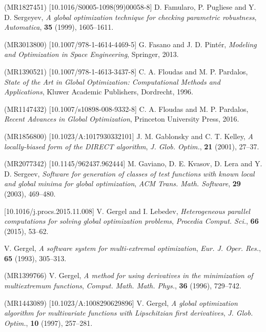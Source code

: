 \documentclass{naco}
\theoremstyle{definition}
\begin{document}
\begin{thebibliography}{99}
 (MR1827451) [10.1016/S0005-1098(99)00058-8]
\newblock D. Famularo, P. Pugliese and Y. D. Sergeyev,
\newblock \emph{\emph{A global optimization technique for checking parametric robustness}},
\newblock \emph{Automatica}, \textbf{35} (1999), 1605--1611.

 (MR3013800) [10.1007/978-1-4614-4469-5]
\newblock G. Fasano and J. D. Pint\'er,
\newblock \emph{Modeling and Optimization in Space Engineering},
\newblock Springer, 2013.

 (MR1390521) [10.1007/978-1-4613-3437-8]
\newblock C. A. Floudas and M. P. Pardalos,
\newblock \emph{State of the Art in Global Optimization: Computational Methods and Applications},
\newblock Kluwer Academic Publishers, Dordrecht, 1996.

 (MR1147432) [10.1007/s10898-008-9332-8]
\newblock C. A. Floudas and M. P. Pardalos,
\newblock \emph{Recent Advances in Global Optimization},
\newblock Princeton University Press, 2016.

 (MR1856800) [10.1023/A:1017930332101]
\newblock J. M. Gablonsky and C. T. Kelley,
\newblock \emph{\emph{A locally-biased form of the DIRECT algorithm}},
\newblock \emph{J. Glob. Optim.}, \textbf{21} (2001), 27--37.

 (MR2077342) [10.1145/962437.962444]
\newblock M. Gaviano, D. E. Kvasov, D. Lera and Y. D. Sergeev,
\newblock \emph{\emph{Software for generation of classes of test functions with known local and global minima for global optimization}},
\newblock \emph{ACM Trans. Math. Software}, \textbf{29} (2003), 469--480.

 [10.1016/j.procs.2015.11.008]
\newblock V. Gergel and I. Lebedev,
\newblock \emph{\emph{Heterogeneous parallel computations for solving global optimization problems}},
\newblock \emph{Procedia Comput. Sci.}, \textbf{66} (2015), 53--62.

\newblock V. Gergel,
\newblock \emph{\emph{A software system for multi-extremal optimization}},
\newblock \emph{Eur. J. Oper. Res.}, \textbf{65} (1993), 305--313.

 (MR1399766)
\newblock V. Gergel,
\newblock \emph{\emph{A method for using derivatives in the minimization of multiextremum functions}},
\newblock \emph{Comput. Math. Math. Phys.}, \textbf{36} (1996), 729--742.

 (MR1443089) [10.1023/A:1008290629896]
\newblock V. Gergel,
\newblock \emph{\emph{A global optimization algorithm for multivariate functions with Lipschitzian first derivatives}},
\newblock \emph{J. Glob. Optim.}, \textbf{10} (1997), 257--281.


\end{thebibliography}
\end{document}
